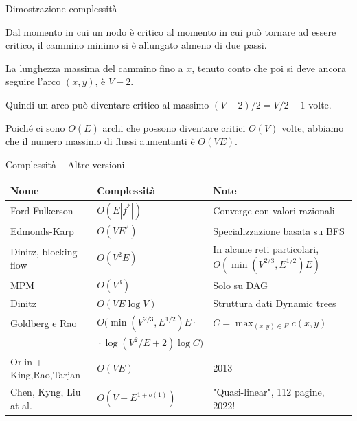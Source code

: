 \begin{frame}{Dimostrazione complessità}

\BIL
\item Dal momento in cui un nodo è critico al momento in cui può tornare ad essere critico, il cammino minimo si è allungato almeno di due passi.
\item La lunghezza massima del cammino fino a $x$, tenuto conto che poi si deve ancora seguire l'arco $(x,y)$,
è $V-2$.
\item Quindi un arco può diventare critico al massimo $(V-2)/2 = V/2-1$ volte.
\item Poiché ci sono $O(E)$ archi che possono diventare critici $O(V)$ volte,
abbiamo che il numero massimo di flussi aumentanti è $O(VE)$. 
\EIL

\end{frame}


\begin{frame}{Complessità -- Altre versioni}

\small
\begin{tabular}{|P{2.6cm}|P{3.5cm}|P{4.1cm}|}
\hline
\textbf{Nome} & \textbf{Complessità} & \textbf{Note} \\\hline
Ford-Fulkerson & $O(E|f^*|)$ & Converge con valori razionali \\\hline
Edmonds-Karp & $O(VE^2)$ & Specializzazione basata su BFS \\\hline
Dinitz, blocking flow & $O(V^2E)$ & In alcune reti particolari, $O(\min(V^{2/3},E^{1/2})E)$ \\\hline
MPM & $O(V^3)$ & Solo su DAG \\\hline
Dinitz & $O(VE \log V)$ & Struttura dati Dynamic trees \\\hline
Goldberg e Rao & \begingroup \footnotesize $O(\min(V^{2/3},E^{1/2})E \cdot {}$ \endgroup & $C=\max_{(x,y) \in E} c(x,y)$ \\
& \begingroup \footnotesize  ${} \cdot \log (V^2/E+2) \log C)$ \endgroup & \\\hline

Orlin + King,Rao,Tarjan & $O(VE)$ & 2013\\\hline
Chen, Kyng, Liu at al. & $O(V +E^{1+o(1)})$ & "Quasi-linear", 112 pagine, 2022!\\\hline
\end{tabular}

\end{frame}

